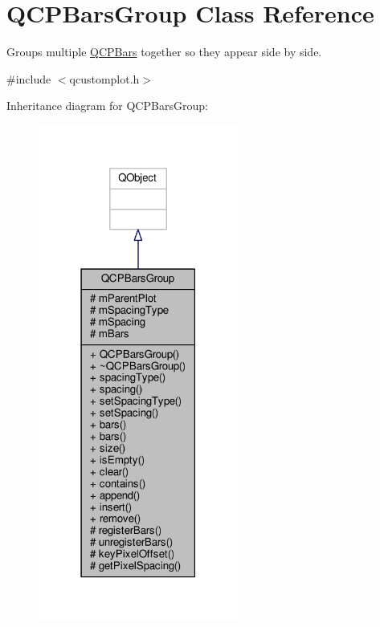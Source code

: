 \hypertarget{class_q_c_p_bars_group}{}\section{Q\+C\+P\+Bars\+Group Class Reference}
\label{class_q_c_p_bars_group}


Groups multiple \hyperlink{class_q_c_p_bars}{Q\+C\+P\+Bars} together so they appear side by side.  




{\ttfamily \#include $<$qcustomplot.\+h$>$}



Inheritance diagram for Q\+C\+P\+Bars\+Group\+:\nopagebreak
\begin{figure}[H]
\begin{center}
\leavevmode
\includegraphics[width=186pt]{class_q_c_p_bars_group__inherit__graph}
\end{center}
\end{figure}



